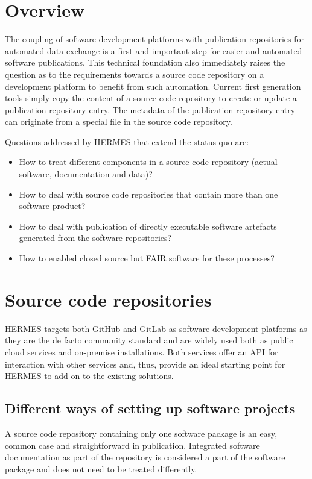 \documentclass{article}
\begin{document}
\section{Overview}\label{qdsioybmcwum}
The coupling of software development platforms with publication repositories for automated data exchange is a first and important step for easier and automated software publications. This technical foundation also immediately raises the question as to the requirements towards a source code repository on a development platform to benefit from such automation. Current first generation tools simply copy the content of a source code repository to create or update a publication repository entry. The metadata of the publication repository entry can originate from a special file in the source code repository.

Questions addressed by HERMES that extend the status quo are:

\begin{itemize}  
\item How to treat different components in a source code repository (actual software, documentation and data)?


\item How to deal with source code repositories that contain more than one software product?


\item How to deal with publication of directly executable software artefacts generated from the software repositories?


\item How to enabled closed source but FAIR software\cite{138880/DPXVI66D} for these processes?


\end{itemize}

\section{Source code repositories}\label{kocqhrfewb2}
HERMES targets both GitHub and GitLab as software development platforms as they are the de facto community standard and are widely used both as public cloud services and on-premise installations. Both services offer an API for interaction with other services and, thus, provide an ideal starting point for HERMES to add on to the existing solutions.



\subsection{Different ways of setting up software projects}\label{c06sju9is784r}
A source code repository containing only one software package is an easy, common case and straightforward in publication. Integrated software documentation as part of the repository is considered a part of the software package and does not need to be treated differently.
\end{document}
